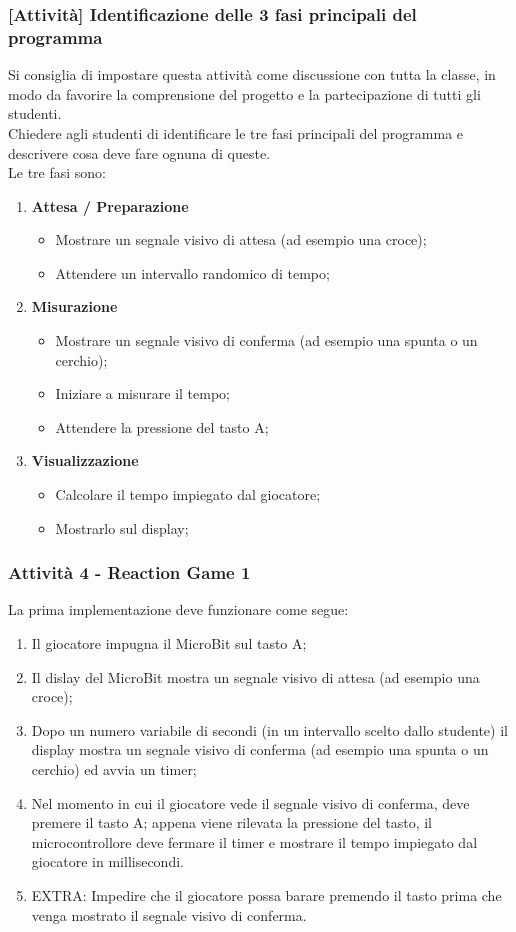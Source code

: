 \documentclass[../../docenti.tex]{subfiles}
\begin{document}
\subsubsection{[Attività] Identificazione delle 3 fasi principali del programma}
Si consiglia di impostare questa attività come discussione con tutta la classe, in modo da favorire la comprensione del progetto e la partecipazione di tutti gli studenti.\\
Chiedere agli studenti di identificare le tre fasi principali del programma e descrivere cosa deve fare ognuna di queste.\\
Le tre fasi sono:
\begin{enumerate}
	\item \textbf{Attesa / Preparazione}
	\begin{itemize}
		\item Mostrare un segnale visivo di attesa (ad esempio una croce);
		\item Attendere un intervallo randomico di tempo;
	\end{itemize}
	\item \textbf{Misurazione}
	\begin{itemize}
		\item Mostrare un segnale visivo di conferma (ad esempio una spunta o un cerchio);
		\item Iniziare a misurare il tempo;
		\item Attendere la pressione del tasto A;
	\end{itemize}
	\item \textbf{Visualizzazione}
	\begin{itemize}
		\item Calcolare il tempo impiegato dal giocatore;
		\item Mostrarlo sul display;
	\end{itemize}
\end{enumerate}

\subsubsection{Attività 4 - Reaction Game 1}

La prima implementazione deve funzionare come segue:
\begin{enumerate}
	\item Il giocatore impugna il MicroBit sul tasto A;
	\item Il dislay del MicroBit mostra un segnale visivo di attesa (ad esempio una croce);
	\item Dopo un numero variabile di secondi (in un intervallo scelto dallo studente) il display mostra un segnale visivo di conferma (ad esempio una spunta o un cerchio) ed avvia un timer;
	\item Nel momento in cui il giocatore vede il segnale visivo di conferma, deve premere il tasto A; appena viene rilevata la pressione del tasto, il microcontrollore deve fermare il timer e mostrare il tempo impiegato dal giocatore in millisecondi.
	\item EXTRA: Impedire che il giocatore possa barare premendo il tasto prima che venga mostrato il segnale visivo di conferma.
\end{enumerate}
\end{document}
